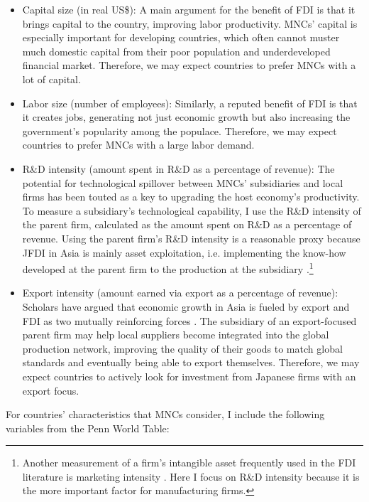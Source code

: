 \begin{itemize}
\item Capital size (in real US\$): A main argument for the benefit of FDI is
  that it brings capital to the country, improving labor productivity. MNCs'
  capital is especially important for developing countries, which often cannot
  muster much domestic capital from their poor population and underdeveloped
  financial market. Therefore, we may expect countries to prefer MNCs with a lot
  of capital.

\item Labor size (number of employees): Similarly, a reputed benefit of FDI is
  that it creates jobs, generating not just economic growth but also increasing
  the government's popularity among the populace. Therefore, we may expect
  countries to prefer MNCs with a large labor demand.

\item R\&D intensity (amount spent in R\&D as a percentage of revenue): The
  potential for technological spillover between MNCs' subsidiaries and local
  firms has been touted as a key to upgrading the host economy's productivity. To
  measure a subsidiary's technological capability, I use the R\&D intensity of
  the parent firm, calculated as the amount spent on R\&D as a percentage of
  revenue. Using the parent firm's R\&D intensity is a reasonable proxy because
  JFDI in Asia is mainly asset exploitation, i.e. implementing the
  know-how developed at the parent firm to the production at the subsidiary
  \citep{Pak2005}.\footnote{Another measurement of a firm's intangible asset
    frequently used in the FDI literature is marketing intensity
    \citep{Girma2005}. Here I focus on R\&D intensity because it is the more
    important factor for manufacturing firms.}

\item Export intensity (amount earned via export as a percentage of revenue):
  Scholars have argued that economic growth in Asia is fueled by export and FDI
  as two mutually reinforcing forces \citep{Liu2002}. The subsidiary of an
  export-focused parent firm may help local suppliers become integrated into
  the global production network, improving the quality of their goods to match
  global standards and eventually being able to export themselves. Therefore, we
  may expect countries to actively look for investment from
  Japanese firms with an export focus.
\end{itemize}

For countries' characteristics that MNCs consider, I include the following
variables from the Penn World Table:

